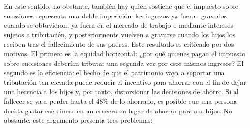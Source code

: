 \documentclass[10pt,a4paper]{article}
\begin{document}
En este sentido, no obstante, también hay quien sostiene que el impuesto sobre sucesiones representa una doble imposición: los ingresos ya fueron gravados cuando se obtuvieron, ya fuera en el mercado de trabajo o mediante intereses sujetos a tributación, y posteriormente vuelven a gravarse cuando los hijos los reciben tras el fallecimiento de sus padres. Este resultado es criticado por dos motivos. El primero es la equidad horizontal: ¿por qué quienes pagan el impuesto sobre sucesiones deberían tributar una segunda vez por esos mismos ingresos? El segundo es la eficiencia: el hecho de que el patrimonio vaya a soportar una tributación tan elevada puede reducir el incentivo para ahorrar con el fin de dejar una herencia a los hijos y, por tanto, distorsionar las decisiones de ahorro. Si al fallecer se va a perder hasta el $48\%$ de lo ahorrado, es posible que una persona decida gastar ese dinero en un crucero en lugar de ahorrar para sus hijos. No obstante, este argumento presenta tres problemas:
\end{document}
